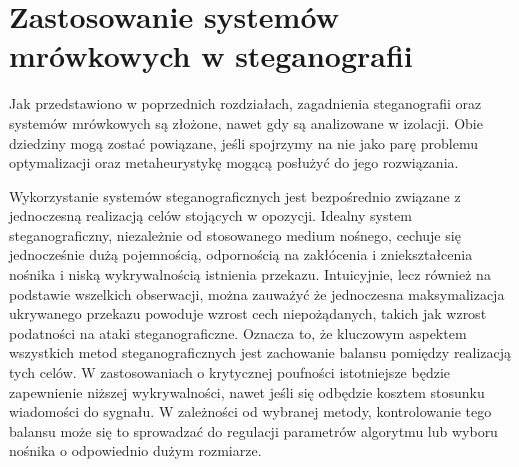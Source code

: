 \chapter{Zastosowanie systemów mrówkowych w steganografii}\label{chap:stegoants}
{

    Jak przedstawiono w poprzednich rozdziałach, zagadnienia steganografii oraz systemów mrówkowych są złożone, nawet
    gdy są analizowane w izolacji. Obie dziedziny mogą zostać powiązane, jeśli spojrzymy na nie jako parę problemu
    optymalizacji oraz metaheurystykę mogącą posłużyć do jego rozwiązania.

    Wykorzystanie systemów steganograficznych jest bezpośrednio związane z jednoczesną realizacją celów stojących w
    opozycji. Idealny system steganograficzny, niezależnie od stosowanego medium nośnego, cechuje się jednocześnie dużą
    pojemnością, odpornością na zakłócenia i zniekształcenia nośnika i niską wykrywalnością istnienia przekazu.
    Intuicyjnie, lecz również na podstawie wszelkich obserwacji, można zauważyć że jednoczesna maksymalizacja ukrywanego
    przekazu powoduje wzrost cech niepożądanych, takich jak wzrost podatności na ataki steganograficzne. Oznacza to, że
    kluczowym aspektem wszystkich metod steganograficznych jest zachowanie balansu pomiędzy realizacją tych celów. W
    zastosowaniach o krytycznej poufności istotniejsze będzie zapewnienie niższej wykrywalności, nawet jeśli się
    odbędzie kosztem stosunku wiadomości do sygnału. W zależności od wybranej metody, kontrolowanie tego balansu może
    się to sprowadzać do regulacji parametrów algorytmu lub wyboru nośnika o odpowiednio dużym rozmiarze.

}
